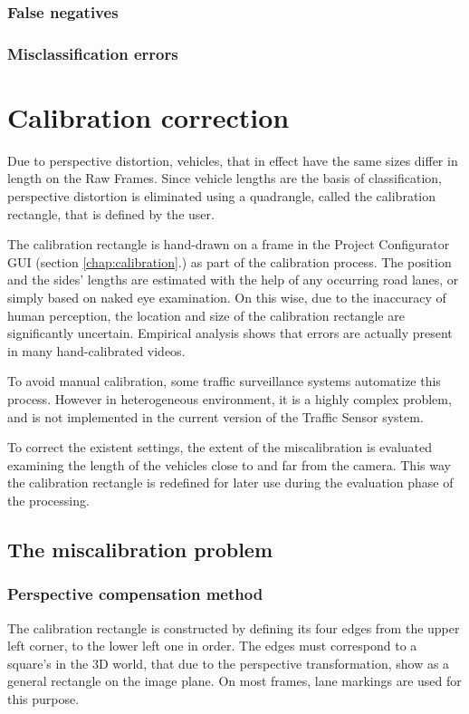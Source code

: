 \subsubsection{False negatives}
\subsubsection{Misclassification errors}

\section{Calibration correction}\label{chap:cal_corr}
Due to perspective distortion, vehicles, that in effect have the same sizes differ in length on the Raw Frames.
Since vehicle lengths are the basis of classification, perspective distortion is eliminated using a quadrangle, called the calibration rectangle, that is defined by the user.

The calibration rectangle is hand-drawn on a frame in the Project Configurator GUI (section \ref{chap:calibration}.) as part of the calibration process.
The position and the sides' lengths are estimated with the help of any occurring road lanes, or simply based on naked eye examination.
On this wise, due to the inaccuracy of human perception, the location and size of the calibration rectangle are significantly uncertain.
Empirical analysis shows that errors are actually present in many hand-calibrated videos.

To avoid manual calibration, some traffic surveillance systems automatize this process.
However in heterogeneous environment, it is a highly complex problem, and is not implemented in the current version of the Traffic Sensor system.

To correct the existent settings, the extent of the miscalibration is evaluated examining the length of the vehicles close to and far from the camera.
This way the calibration rectangle is redefined for later use during the evaluation phase of the processing.

\subsection{The miscalibration problem}
\subsubsection{Perspective compensation method}
The calibration rectangle is constructed by defining its four edges from the upper left corner, to the lower left one in order.
The edges must correspond to a square's in the 3D world, that due to the perspective transformation, show as a general rectangle on the image plane.
On most frames, lane markings are used for this purpose.

